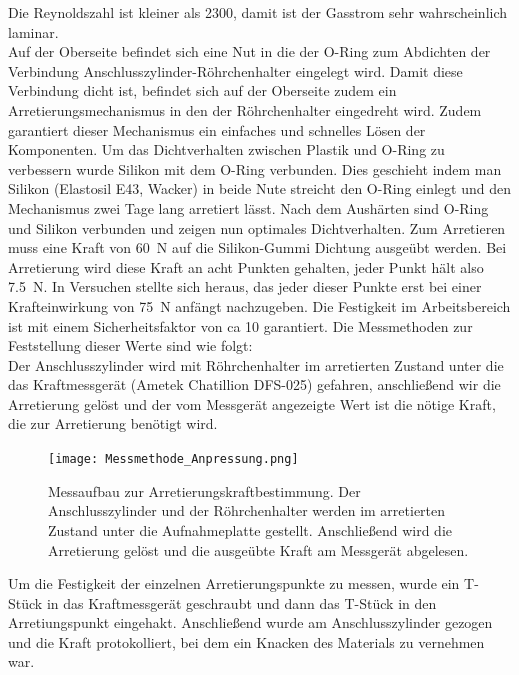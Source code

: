 Die Reynoldszahl ist kleiner als 2300, damit ist der Gasstrom sehr wahrscheinlich laminar. \\
Auf der Oberseite befindet sich eine Nut in die der O-Ring zum Abdichten der Verbindung Anschlusszylinder-Röhrchenhalter eingelegt wird. Damit diese Verbindung dicht ist, befindet sich auf der Oberseite zudem ein Arretierungsmechanismus in den der Röhrchenhalter eingedreht wird. Zudem garantiert dieser Mechanismus ein einfaches und schnelles Lösen der Komponenten. Um das Dichtverhalten zwischen Plastik und O-Ring zu verbessern wurde Silikon mit dem O-Ring verbunden. Dies geschieht indem man Silikon (Elastosil E43, Wacker) in beide Nute streicht den O-Ring einlegt und den Mechanismus zwei Tage lang arretiert lässt. Nach dem Aushärten sind O-Ring und Silikon verbunden und zeigen nun optimales Dichtverhalten. 
Zum Arretieren muss eine Kraft von \SI{60}{N} auf die Silikon-Gummi Dichtung ausgeübt werden. Bei Arretierung wird diese Kraft an acht Punkten gehalten, jeder Punkt hält also \SI{7,5}{N}. In Versuchen stellte sich heraus, das jeder dieser Punkte erst bei einer Krafteinwirkung von \SI{75}{N} anfängt nachzugeben. Die Festigkeit im Arbeitsbereich ist mit einem Sicherheitsfaktor von ca 10 garantiert. Die Messmethoden zur Feststellung dieser Werte sind wie folgt: \hfill \\
Der Anschlusszylinder wird mit Röhrchenhalter im arretierten Zustand unter die das Kraftmessgerät (Ametek Chatillion DFS-025) gefahren, anschließend wir die Arretierung gelöst und der vom Messgerät angezeigte Wert ist die nötige Kraft, die zur Arretierung benötigt wird. 

\begin{figure}[h!]
	\begin{center}
		\texttt{[image: Messmethode\_Anpressung.png]}
		\caption[Messaufbau Arretierung 1]{Messaufbau zur Arretierungskraftbestimmung. Der Anschlusszylinder und der Röhrchenhalter werden im arretierten Zustand unter die Aufnahmeplatte gestellt. Anschließend wird die Arretierung gelöst und die ausgeübte Kraft am Messgerät abgelesen.}
	\end{center}
\end{figure}

Um die Festigkeit der einzelnen Arretierungspunkte zu messen, wurde ein T-Stück in das Kraftmessgerät geschraubt und dann das T-Stück in den Arretiungspunkt eingehakt. Anschließend wurde am Anschlusszylinder gezogen und die Kraft protokolliert, bei dem ein Knacken des Materials zu vernehmen war.

